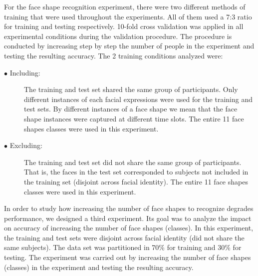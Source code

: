 \documentclass[]{article}
\begin{document}
For the face shape recognition experiment, there were two different methods of training that were used throughout the
experiments. All of them used a 7:3 ratio for training and testing respectively. 10-fold cross validation was
applied in all experimental conditions during the validation procedure. The procedure is conducted
by increasing step by step the number of people in the experiment and testing the resulting
accuracy. The 2 training conditions analyzed were:

\begin{description}
	\item[$\bullet$ Including:] The training and test set shared the same group of participants. Only different instances
	of each facial expressions were used for the training and test sets. By different instances of a face shape we mean
	that the face shape instances were captured at different time slots. The entire 11 face shapes classes were used in
	this experiment.
	\item[$\bullet$ Excluding:] The training and test set did not share the same group of participants. That is, the faces
	in the test set corresponded to subjects not included in the training set (disjoint across facial identity). The entire
	11 face shapes classes were used in this experiment.
\end{description}


In order to study how increasing the number of face shapes to recognize degrades performance, we designed a third
experiment. Its goal was to analyze the impact on accuracy of increasing the number of face shapes (classes).  In this
experiment, the training and test sets were disjoint across facial identity (did not share the same subjects).
The data set was partitioned in 70\% for training and 30\% for testing. The experiment was carried out by increasing the
number of face shapes (classes) in the experiment and testing the resulting accuracy.
\end{document}
